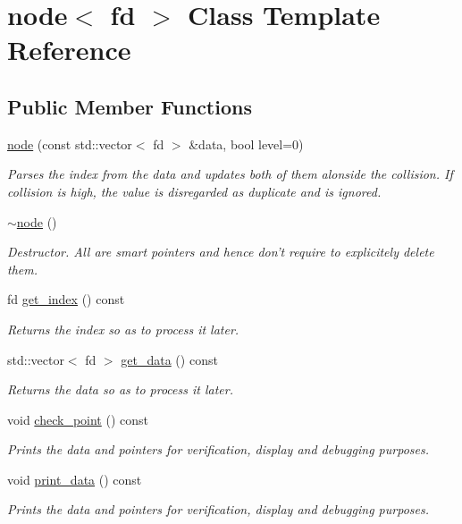 \hypertarget{classnode}{\section{node$<$ fd $>$ Class Template Reference}
\label{classnode}
}
\subsection*{Public Member Functions}
\begin{DoxyCompactItemize}
\item 
\hyperlink{classnode_a4856fc27552aa1360d252359853ee671}{node} (const std\-::vector$<$ fd $>$ \&data, bool level=0)
\begin{DoxyCompactList}\small\item\em Parses the index from the data and updates both of them alonside the collision. If collision is high, the value is disregarded as duplicate and is ignored. \end{DoxyCompactList}\item 
\hyperlink{classnode_a55699ad13ccb948e07d3f1e9a1e084e4}{$\sim$node} ()
\begin{DoxyCompactList}\small\item\em Destructor. All are smart pointers and hence don't require to explicitely delete them. \end{DoxyCompactList}\item 
fd \hyperlink{classnode_af47c45dd8ec3b72a8368ac541631f282}{get\-\_\-index} () const 
\begin{DoxyCompactList}\small\item\em Returns the index so as to process it later. \end{DoxyCompactList}\item 
std\-::vector$<$ fd $>$ \hyperlink{classnode_a358a1e8677402d724cf9f7c9c11c66e1}{get\-\_\-data} () const 
\begin{DoxyCompactList}\small\item\em Returns the data so as to process it later. \end{DoxyCompactList}\item 
void \hyperlink{classnode_a83d93d1cf6f7759302de4dc9a63bef4c}{check\-\_\-point} () const 
\begin{DoxyCompactList}\small\item\em Prints the data and pointers for verification, display and debugging purposes. \end{DoxyCompactList}\item 
void \hyperlink{classnode_a0ad70bac16602d7911a575ccaa6bc282}{print\-\_\-data} () const 
\begin{DoxyCompactList}\small\item\em Prints the data and pointers for verification, display and debugging purposes. \end{DoxyCompactList}\end{DoxyCompactItemize}
